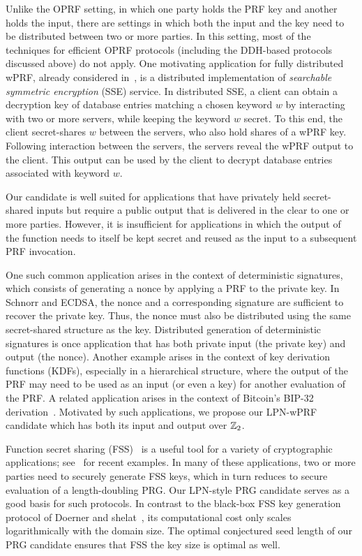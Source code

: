 Unlike the OPRF setting, in which one party holds the PRF key and another holds the input, there are settings in which both the input and the key need to be distributed between two or more parties. In this setting, most of the techniques for efficient OPRF protocols (including the DDH-based protocols discussed above) do not apply. One motivating application for fully distributed wPRF,  already considered in~\cite{IshaiKLO16,boneh2018-darkmatter}, is a distributed implementation of {\em searchable symmetric encryption} (SSE) service. In distributed SSE, a client can obtain a decryption key of database entries matching a chosen keyword $w$ by interacting with two or more servers, while keeping the keyword $w$ secret.  To this end, the client secret-shares $w$ between the servers, who also hold shares of a wPRF key. Following interaction between the servers, the servers reveal the wPRF output to the client. This output can be used by the client to decrypt database entries associated with keyword $w$.

 Our \ttwPRF candidate is well suited for applications that have privately held secret-shared inputs but require a public output that is delivered in the clear to one or more parties. However, it is insufficient for applications in which the output of the function needs to itself be kept secret and reused as the input to a subsequent PRF invocation.

One such common application arises in the context of deterministic signatures, which consists of generating a nonce by applying a PRF to the private key. In Schnorr and ECDSA, the nonce and a corresponding signature are sufficient to recover the private key. Thus, the nonce must also be distributed using the same secret-shared structure as the key. Distributed generation of deterministic signatures is once application that has both private input (the private key) and output (the nonce). Another example arises in the context of key derivation functions (KDFs), especially in a hierarchical structure, where the output of the PRF may need to be used as an input (or even a key) for another evaluation of the PRF. A related application arises in the context of Bitcoin's BIP-32 derivation~\cite{bitcoin_bip0032}. Motivated by such applications, we propose our LPN-wPRF candidate which has both its input and output over $\mathbb{Z}_2$.

 Function secret sharing (FSS)~\cite{boyle2015-fss} is a useful tool for a variety of cryptographic applications; see~\cite{BoyleCGGIKR20,boyle2020-lpn-pcg} for recent examples. In many of these applications, two or more parties need to securely generate FSS keys, which in turn reduces to secure evaluation of a length-doubling PRG. Our LPN-style PRG candidate serves as a good basis for such protocols. In contrast to the black-box FSS key generation protocol of Doerner and shelat~\cite{DoernerS17}, its computational cost only scales logarithmically with the domain size. The optimal conjectured seed length of our PRG candidate ensures that FSS the key size is optimal as well.

